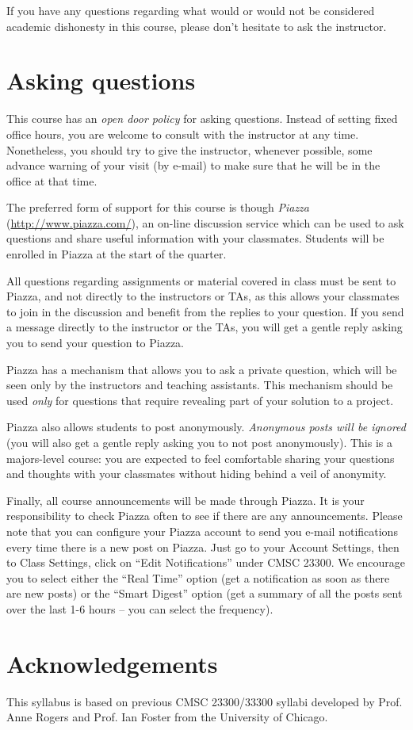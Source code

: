 \documentclass[11pt]{article}
\begin{document}
If you have any questions regarding what would or would not be considered academic dishonesty in this course, please don't hesitate to ask the instructor.


\section{Asking questions}
\label{asking}

This course has an \emph{open door policy} for asking questions. Instead of setting fixed office hours, you are welcome to consult with the instructor at any time. Nonetheless, you should try to give the instructor, whenever possible, some advance warning of your visit (by e-mail) to make sure that he will be in the office at that time.

The preferred form of support for this course is though \emph{Piazza} (\url{http://www.piazza.com/}), an on-line discussion service which can be used to ask questions and share useful information with your classmates. Students will be enrolled in Piazza at the start of the quarter.

All questions regarding assignments or material covered in class must be sent to Piazza, and not directly to the instructors or TAs, as this allows your classmates to join in the discussion and benefit from the replies to your question. If you send a message directly to the instructor or the TAs, you will get a gentle reply asking you to send your question to Piazza. 

Piazza has a mechanism that allows you to ask a private question, which will be seen only by the instructors and teaching assistants. This mechanism should be used \emph{only} for questions that require revealing part of your solution to a project.

Piazza also allows students to post anonymously. \emph{Anonymous posts will be ignored} (you will also get a gentle reply asking you to not post anonymously). This is a majors-level course: you are expected to feel comfortable sharing your questions and thoughts with your classmates without hiding behind a veil of anonymity.

Finally, all course announcements will be made through Piazza. It is your responsibility to check Piazza often to see if there are any announcements. Please note that you can configure your Piazza account to send you e-mail notifications every time there is a new post on Piazza. Just go to your Account Settings, then to Class Settings, click on ``Edit Notifications'' under CMSC 23300. We 
encourage you to select either the ``Real Time'' option (get a notification as soon as there are new posts) or the ``Smart Digest'' option (get a summary of all the posts sent over the last 1-6 hours -- you can select the frequency).


\section{Acknowledgements}

This syllabus is based on previous CMSC 23300/33300 syllabi developed by Prof. Anne Rogers and Prof. Ian Foster from the University of Chicago.
\end{document}
